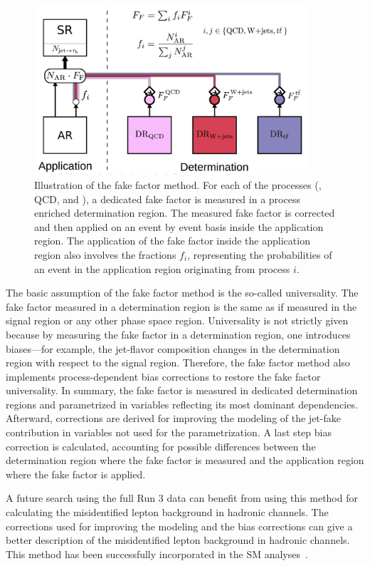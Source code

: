 \begin{figure}[htbp]
  \centering
  \includegraphics[width=0.9\textwidth]{plots/appendix/FF.png}
  \caption{Illustration of the fake factor method. For each of the processes (\wjets, QCD, and \ttbar), a dedicated fake factor is measured in a process enriched determination region. The measured fake factor is corrected and then applied on an event by event basis inside the application region. The application of the fake factor inside the application region also involves the fractions $f_i$, representing the probabilities of an event in the application region originating from process $i$.}
  \label{fig:ff}
\end{figure}

The basic assumption of the fake factor method is the so-called universality. The fake factor measured in a determination region is the same as if measured in the signal region or any other phase space region. Universality is not strictly given because by measuring the fake factor in a determination region, one introduces biases—for example, the jet-flavor composition changes in the determination region with respect to the signal region. Therefore, the fake factor method also implements process-dependent bias corrections to restore the fake factor universality. In summary, the fake factor is measured in dedicated determination regions and parametrized in variables reflecting its most dominant dependencies. Afterward, corrections are derived for improving the modeling of the jet-\tauh fake contribution in variables not used for the parametrization. A last step bias correction is calculated, accounting for possible differences between the determination region where the fake factor is measured and the application region where the fake factor is applied.

A future search using the full Run 3 data can benefit from using this method for calculating the misidentified lepton background in hadronic channels. The corrections used for improving the modeling and the bias corrections can give a better description of the misidentified lepton background in hadronic channels. This method has been successfully incorporated in the SM \Htt analyses~\cite{CMS:2019pyn}.

